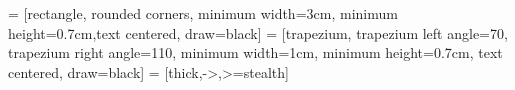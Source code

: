 \usepackage{tikz}
\usetikzlibrary{shapes.geometric, arrows}

 = [rectangle, rounded corners, minimum width=3cm, minimum height=0.7cm,text centered, draw=black]
 = [trapezium, trapezium left angle=70, trapezium right angle=110, minimum width=1cm,  minimum height=0.7cm, text centered, draw=black]
 = [thick,->,>=stealth]

\newcommand*\circled[1]{\tikz[baseline=(char.base)]{
            \node[shape=circle,draw,inner sep=1pt] (char) {#1};}}



\usepackage{makeidx}
\makeindex

\newcommand{\monthyear}{%
  \ifcase\month\or January\or February\or March\or April\or May\or June\or
  July\or August\or September\or October\or November\or
  December\fi\space\number\year
}

\newenvironment{docspec}{\begin{quotation}\ttfamily\parskip0pt\parindent0pt\ignorespaces}{\end{quotation}}%


\newcommand{\openepigraph}[2]{%
  \begin{fullwidth}
  \sffamily\large
  \begin{doublespace}
  \noindent\allcaps{#1}\\%
  \noindent\allcaps{#2}%
  \end{doublespace}
  \end{fullwidth}
}


